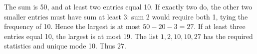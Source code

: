 The sum is 50, and at least two entries equal 10. If exactly two do, the other two smaller entries must have sum at least 3: sum 2 would require both 1, tying the frequency of 10. Hence the largest is at most $50-20-3=27$. If at least three entries equal 10, the largest is at most 19. The list $1,2,10,10,27$ has the required statistics and unique mode 10. Thus $\boxed{27}$.
